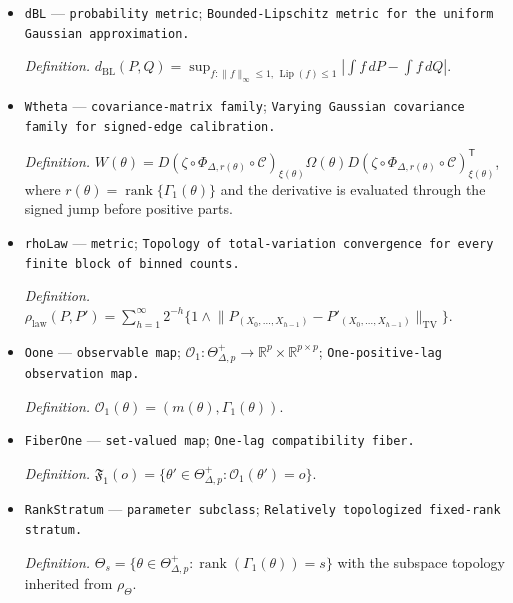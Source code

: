 \documentclass{article}
\begin{document}
\begin{itemize}
  \par\smallskip\noindent\emph{Definition.} \(\alpha_{Y,\theta}(h)\) is the strong-mixing coefficient at separation \(h\) of the stationary raw-moment sequence \(Y\) under \(P_{\theta}\).
  \item \texttt{dBL} --- \texttt{probability metric}; \texttt{Bounded-\allowbreak{}Lipschitz metric for the uniform Gaussian approximation.}
  \par\smallskip\noindent\emph{Definition.} \(d_{\mathrm{BL}}(P,Q)=\sup_{f:\lVert f\rVert_{\infty}\leq1,\,\operatorname{Lip}(f)\leq1}|\int f\,dP-\int f\,dQ|\).
  \item \texttt{Wtheta} --- \texttt{covariance-\allowbreak{}matrix family}; \texttt{Varying Gaussian covariance family for signed-\allowbreak{}edge calibration.}
  \par\smallskip\noindent\emph{Definition.} \(W(\theta)=D(\zeta\circ\Phi_{\Delta,r(\theta)}\circ\mathcal C)_{\xi(\theta)}\Omega(\theta)D(\zeta\circ\Phi_{\Delta,r(\theta)}\circ\mathcal C)_{\xi(\theta)}^{\mathsf T}\), where \(r(\theta)=\operatorname{rank}\{\Gamma_1(\theta)\}\) and the derivative is evaluated through the signed jump before positive parts.
  \item \texttt{rhoLaw} --- \texttt{metric}; \texttt{Topology of total-\allowbreak{}variation convergence for every finite block of binned counts.}
  \par\smallskip\noindent\emph{Definition.} \(\rho_{\mathrm{law}}(P,P')=\sum_{h=1}^{\infty}2^{-h}\{1\wedge\lVert P_{(X_0,\ldots,X_{h-1})}-P'_{(X_0,\ldots,X_{h-1})}\rVert_{\mathrm{TV}}\}\).
  \item \texttt{Oone} --- \texttt{observable map}; \(\mathcal O_1:\Theta_{\Delta,p}^{+}\to\mathbb R^p\times\mathbb R^{p\times p}\); \texttt{One-\allowbreak{}positive-\allowbreak{}lag observation map.}
  \par\smallskip\noindent\emph{Definition.} \(\mathcal O_1(\theta)=(m(\theta),\Gamma_1(\theta))\).
  \item \texttt{FiberOne} --- \texttt{set-\allowbreak{}valued map}; \texttt{One-\allowbreak{}lag compatibility fiber.}
  \par\smallskip\noindent\emph{Definition.} \(\mathfrak F_1(o)=\{\theta'\in\Theta_{\Delta,p}^{+}:\mathcal O_1(\theta')=o\}\).
  \item \texttt{RankStratum} --- \texttt{parameter subclass}; \texttt{Relatively topologized fixed-\allowbreak{}rank stratum.}
  \par\smallskip\noindent\emph{Definition.} \(\Theta_s=\{\theta\in\Theta_{\Delta,p}^{+}:\operatorname{rank}(\Gamma_1(\theta))=s\}\) with the subspace topology inherited from \(\rho_{\Theta}\).

\end{itemize}
\end{document}

